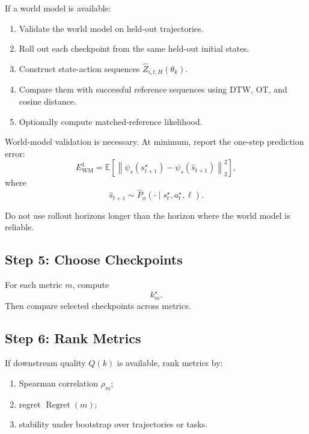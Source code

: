 \documentclass[11pt]{article}
\begin{document}
If a world model is available:
\begin{enumerate}
    \item Validate the world model on held-out trajectories.
    \item Roll out each checkpoint from the same held-out initial states.
    \item Construct state-action sequences $\widehat{Z}_{i,t,H}(\theta_k)$.
    \item Compare them with successful reference sequences using DTW, OT, and cosine distance.
    \item Optionally compute matched-reference likelihood.
\end{enumerate}

World-model validation is necessary. At minimum, report the one-step prediction error:
\begin{equation}
E_{\mathrm{WM}}^{1}
=
\mathbb{E}
\left[
\left\|\psi_s(s^{\star}_{t+1})-\psi_s(\hat{s}_{t+1})\right\|_2^2
\right],
\end{equation}
where
\begin{equation}
\hat{s}_{t+1}\sim \widehat{P}_{\phi}(\cdot\mid s^{\star}_t,a^{\star}_t,\ell).
\end{equation}

Do not use rollout horizons longer than the horizon where the world model is reliable.

\subsection*{Step 5: Choose Checkpoints}

For each metric $m$, compute
\begin{equation}
k_m^{\star}.
\end{equation}
Then compare selected checkpoints across metrics.

\subsection*{Step 6: Rank Metrics}

If downstream quality $Q(k)$ is available, rank metrics by:
\begin{enumerate}
    \item Spearman correlation $\rho_m$;
    \item regret $\operatorname{Regret}(m)$;
    \item stability under bootstrap over trajectories or tasks.
\end{enumerate}
\end{document}
